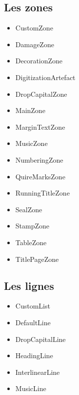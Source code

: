 \documentclass[class=article, crop=false]{standalone}
\begin{document}
\subsection{Les zones}
\begin{itemize}
\item CustomZone
\item DamageZone
\item DecorationZone
\item DigitizationArtefact
\item DropCapitalZone
\item MainZone
\item MarginTextZone
\item MusicZone
\item NumberingZone
\item QuireMarksZone
\item RunningTitleZone
\item SealZone
\item StampZone
\item TableZone
\item TitlePageZone
\end{itemize}

\subsection{Les lignes}
\begin{itemize}
\item CustomList
\item DefaultLine
\item DropCapitalLine
\item HeadingLine
\item InterlinearLine
\item MusicLine
\end{itemize}
	
\end{document}
